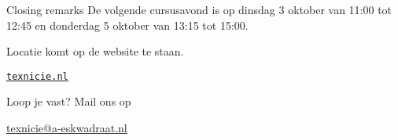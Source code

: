 \begin{frame}{Closing remarks}
De volgende cursusavond is op dinsdag 3 oktober van 11:00 tot 12:45 en donderdag 5 oktober van 13:15 tot 15:00.

Locatie komt op de website te staan.

\bigskip

\leavevmode\bigskip

\begin{center}
    \centering \LARGE\href{https://texnicie.nl}{\ul{\texttt{texnicie.nl}}}
\end{center}
 \begin{center}
         Loop je vast? Mail ons op\par
         \url{texnicie@a-eskwadraat.nl}
 \end{center}

\end{frame}
